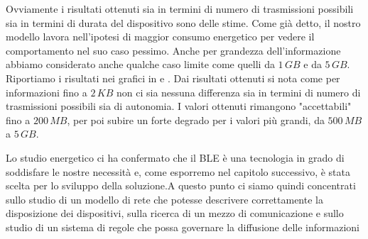 Ovviamente i risultati ottenuti sia in termini di numero di trasmissioni possibili sia in termini di durata del dispositivo sono delle stime. Come già detto, il nostro modello lavora nell'ipotesi di maggior consumo energetico per vedere il comportamento nel suo caso pessimo. Anche per grandezza dell'informazione abbiamo considerato anche qualche caso limite come quelli da $1\,GB$ e da $5\,GB$. Riportiamo i risultati nei grafici in  e . Dai risultati ottenuti si nota come per informazioni fino a $2\,KB$ non ci sia nessuna differenza sia in termini di numero di trasmissioni possibili sia di autonomia. I valori ottenuti rimangono "accettabili" fino a $200\,MB$, per poi subire un forte degrado per i valori più grandi, da $500\,MB$ a $5\,GB$.

Lo studio energetico ci ha confermato che il BLE è una tecnologia in grado di soddisfare le nostre necessità e, come esporremo nel capitolo successivo, è stata scelta per lo sviluppo della soluzione.A questo punto ci siamo quindi concentrati sullo studio di un modello di rete che potesse descrivere correttamente la disposizione dei dispositivi, sulla ricerca di un mezzo di comunicazione e sullo studio di un sistema di regole che possa governare la diffusione delle informazioni

